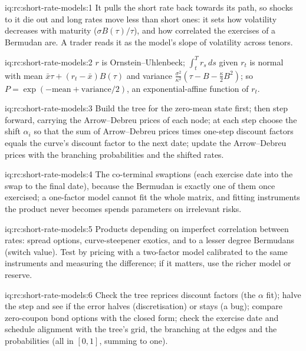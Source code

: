 \begin{solution}{iq:rc:short-rate-models:1}
It pulls the short rate back towards its path, so shocks to it die out and
long rates move less than short ones: it sets how volatility decreases with
maturity ($\sigma B(\tau)/\tau$), and how correlated the exercises of a Bermudan are.
A trader reads it as the model's slope of volatility across tenors.
\end{solution}

\begin{solution}{iq:rc:short-rate-models:2}
$r$ is Ornstein--Uhlenbeck; $\int_t^Tr_s\,ds$ given $r_t$ is normal with mean $\bar
x\tau+(r_t-\bar x)B(\tau)$ and variance $\frac{\sigma^2}{\kappa^2}(\tau-B-\frac\kappa2B^2)$; so
$P = \exp(-\text{mean}+\text{variance}/2)$, an exponential-affine function of $r_t$.
\end{solution}

\begin{solution}{iq:rc:short-rate-models:3}
Build the tree for the zero-mean state first; then step forward, carrying the
Arrow--Debreu prices of each node; at each step choose the shift $\alpha_i$ so that
the sum of Arrow--Debreu prices times one-step discount factors equals the
curve's discount factor to the next date; update the Arrow--Debreu prices with
the branching probabilities and the shifted rates.
\end{solution}

\begin{solution}{iq:rc:short-rate-models:4}
The co-terminal swaptions (each exercise date into the swap to the final
date), because the Bermudan is exactly one of them once exercised; a one-factor
model cannot fit the whole matrix, and fitting instruments the product never
becomes spends parameters on irrelevant risks.
\end{solution}

\begin{solution}{iq:rc:short-rate-models:5}
Products depending on imperfect correlation between rates: spread options,
curve-steepener exotics, and to a lesser degree Bermudans (switch value). Test
by pricing with a two-factor model calibrated to the same instruments and
measuring the difference; if it matters, use the richer model or reserve.
\end{solution}

\begin{solution}{iq:rc:short-rate-models:6}
Check the tree reprices discount factors (the $\alpha$ fit); halve the step and see
if the error halves (discretisation) or stays (a bug); compare zero-coupon bond
options with the closed form; check the exercise date and schedule alignment
with the tree's grid, the branching at the edges and the probabilities (all in
$[0,1]$, summing to one).
\end{solution}
